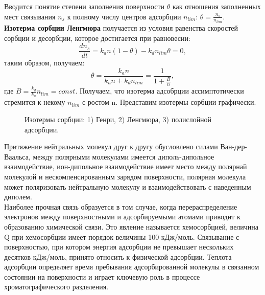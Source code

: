 \documentclass[12pt]{article}
\begin{document}
\begin{flushleft}
Вводится понятие степени заполнения поверхности $\theta$ как отношения заполненных мест
связывания $n_s$ к полному числу центров адсорбции $n_{lim}$: $\theta = \frac{n_s}{n_{lim}}$.\\
\textbf{Изотерма сорбции Ленгмюра} получается из условия равенства скоростей
сорбции и десорбции, которое достигается при равновесии: 
\begin{equation}
\frac{dn_s}{dt} = k_a n(1-\theta) - k_d n_{lim} \theta = 0,
\end{equation} 
таким образом, получаем:
\begin{equation}
\theta = \frac{k_a n}{k_a n + k_d n_{lim}} = \frac{1}{1 + \frac{B}{n}},
\end{equation}
где $B = \frac{k_d}{k_a}n_{lim} = const$. Получаем, что изотерма адсобрции ассимптотически стремится к некому $n_{lim}$ с ростом n. Представим изотермы сорбции графически.\\
\begin{figure}[!h]
\caption{Изотермы сорбции: 1) Генри, 2) Ленгмюра, 3)  полислойной
адсорбции.}
\label{ris:image}
\end{figure}
Притяжение нейтральных молекул друг к
другу обусловлено силами Ван-дер-Ваальса, между полярными молекулами имеется
диполь-дипольное взаимодействие, ион-дипольное взаимодействие имеет место между
полярнай молекулой и нескомпенсированным зарядом поверхности, полярная молекула
может поляризовать нейтральную молекулу и взаимодействовать с наведенным диполем. \\
Наиболее прочная связь образуется в том случае, когда перераспределение электронов
между поверхностными и адсорбируемыми атомами приводит к образованию химической
связи. Это явление называется хемосорбцией, величина Q при хемосорбции имеет
порядок величины 100 кДж/моль. Связывание с поверхностью, при котором энергия
адсорбции не превышает нескольких десятков кДж/моль, принято относить к физической
адсорбции. Теплота адсорбции определяет время пребывания адсорбированной молекулы в
связанном состоянии на поверхности и играет ключевую роль в процессе
хроматографического разделения.

\end{flushleft}
\end{document}
